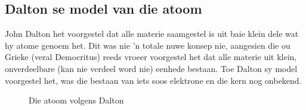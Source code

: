 \subsection*{Dalton se model van die atoom}
\begin{minipage}{.5\textwidth}
John Dalton het voorgestel dat alle materie saamgestel is uit baie klein dele wat hy atome genoem het. Dit was nie 'n totale nuwe konsep nie, aangesien die ou Grieke (veral Democritus) reeds vroeer voorgestel het dat alle materie ​uit klein, onverdeelbare (kan nie verdeel word nie) eenhede bestaan. Toe Dalton sy model voorgestel het, was die bestaan van iets soos elektrone en die kern nog onbekend. 
\end{minipage}
\begin{minipage}{.5\textwidth}
   \setcounter{subfigure}{0}
	\begin{figure}[H] %
    \begin{center}
\begin{minipage}{.8\textwidth}
\caption{Die atoom volgens Dalton}
\end{minipage}
\label{fig:atom:dalton}
\end{center}
 \end{figure}
\end{minipage}

      \label{m38756*uid1}
